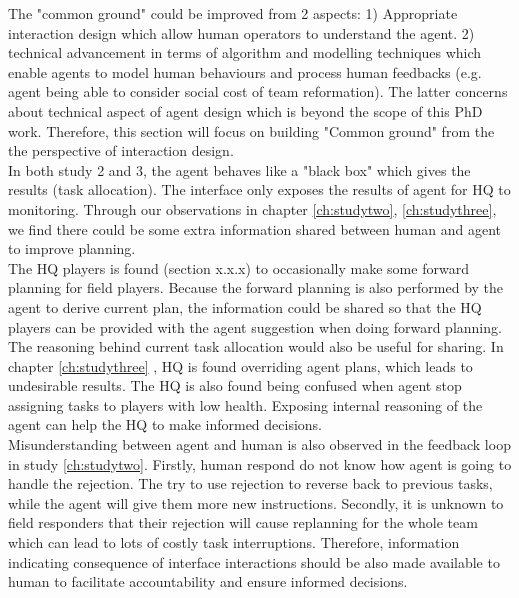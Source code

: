 The "common ground" could be improved from 2 aspects:  1) Appropriate interaction design which allow human operators to understand the agent. 2) technical advancement in terms of algorithm and modelling techniques which enable agents to model human behaviours and process human feedbacks (e.g. agent being able to consider social cost of team reformation). The latter concerns about technical aspect of agent design which is beyond the scope of this PhD work. Therefore, this section will focus on building "Common ground" from the the perspective of interaction design. \\

In both study 2 and 3, the agent behaves like a "black box" which gives the results (task allocation). The interface only exposes the results of agent for HQ to monitoring. Through our observations in chapter \ref{ch:studytwo}, \ref{ch:studythree}, we find there could be some extra information shared between human and agent to improve planning.\\

The HQ players is found (section x.x.x) to occasionally make some forward planning for field players. Because the forward planning is also performed by the agent to derive current plan, the information could be shared so that the HQ players can be provided with the agent suggestion when doing forward planning.\\

The reasoning behind current task allocation would also be useful for sharing. In chapter \ref{ch:studythree} , HQ is found overriding agent plans, which leads to undesirable results. The HQ is also found being confused when agent stop assigning tasks to players with low health. Exposing internal reasoning of the agent can help the HQ to make informed decisions. \\

Misunderstanding between agent and human is also observed in the feedback loop in study \ref{ch:studytwo}. Firstly, human respond do not know how agent is going to handle the rejection. The try to use rejection to reverse back to previous tasks, while the agent will give them more new instructions. Secondly, it is unknown to field responders that their rejection will cause replanning for the whole team which can lead to lots of costly task interruptions. Therefore, information indicating consequence of interface interactions should be also made available to human to facilitate accountability and ensure informed decisions. \\

